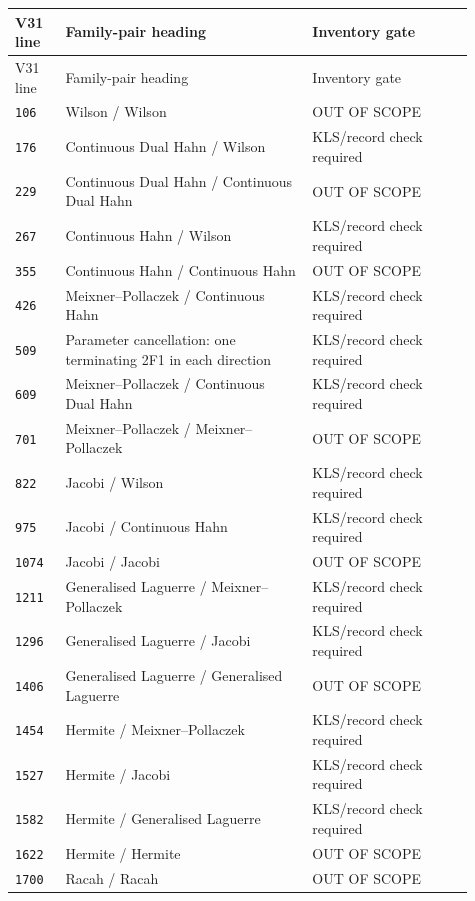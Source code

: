 \documentclass[11pt]{article}
\begin{document}
\begingroup\footnotesize
\setlength{\tabcolsep}{4pt}
\begin{longtable}{@{}p{0.10\linewidth}p{0.49\linewidth}p{0.32\linewidth}@{}}
\toprule V31 line & Family-pair heading & Inventory gate \\
\midrule\endfirsthead
\toprule V31 line & Family-pair heading & Inventory gate \\
\midrule\endhead
\bottomrule\endfoot
\texttt{106} & Wilson / Wilson & OUT OF SCOPE \\
\texttt{176} & Continuous Dual Hahn / Wilson & KLS/record check required \\
\texttt{229} & Continuous Dual Hahn / Continuous Dual Hahn & OUT OF SCOPE \\
\texttt{267} & Continuous Hahn / Wilson & KLS/record check required \\
\texttt{355} & Continuous Hahn / Continuous Hahn & OUT OF SCOPE \\
\texttt{426} & Meixner--Pollaczek / Continuous Hahn & KLS/record check required \\
\texttt{509} & Parameter cancellation: one terminating 2F1 in each direction & KLS/record check required \\
\texttt{609} & Meixner--Pollaczek / Continuous Dual Hahn & KLS/record check required \\
\texttt{701} & Meixner--Pollaczek / Meixner--Pollaczek & OUT OF SCOPE \\
\texttt{822} & Jacobi / Wilson & KLS/record check required \\
\texttt{975} & Jacobi / Continuous Hahn & KLS/record check required \\
\texttt{1074} & Jacobi / Jacobi & OUT OF SCOPE \\
\texttt{1211} & Generalised Laguerre / Meixner--Pollaczek & KLS/record check required \\
\texttt{1296} & Generalised Laguerre / Jacobi & KLS/record check required \\
\texttt{1406} & Generalised Laguerre / Generalised Laguerre & OUT OF SCOPE \\
\texttt{1454} & Hermite / Meixner--Pollaczek & KLS/record check required \\
\texttt{1527} & Hermite / Jacobi & KLS/record check required \\
\texttt{1582} & Hermite / Generalised Laguerre & KLS/record check required \\
\texttt{1622} & Hermite / Hermite & OUT OF SCOPE \\
\texttt{1700} & Racah / Racah & OUT OF SCOPE \\

\end{longtable}
\end{document}
